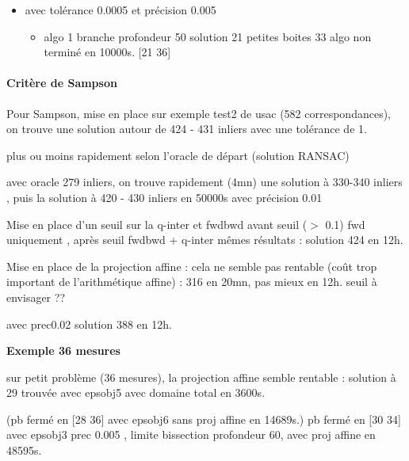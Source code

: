 \documentclass{article}
\begin{document}
\begin{itemize}
\item avec tol\'erance 0.0005  et pr\'ecision 0.005
\begin{itemize}
\item  algo 1 branche profondeur 50 solution 21   petites boites 33 algo non termin\'e en 10000s. [21 36]
\end{itemize}

\end{itemize}



\paragraph{Crit\`ere de Sampson}

Pour Sampson, mise en place 
sur exemple test2 de usac (582 correspondances),  on trouve une solution autour de 424 - 431  inliers  avec une tol\'erance de 1.

plus ou moins rapidement selon l'oracle de d\'epart  (solution RANSAC)

avec oracle 279 inliers, on trouve rapidement (4mn) une solution \`a 330-340 inliers , puis la solution \`a 420 - 430 inliers en 50000s
avec pr\'ecision 0.01

Mise en place d'un seuil sur la q-inter et fwdbwd
avant seuil ($>$ 0.1)  fwd uniquement , apr\`es seuil  fwdbwd + q-inter
m\^emes r\'esultats : solution 424 en 12h.


Mise en place de la projection affine : cela ne semble pas rentable (co\^ut trop important  de l'arithm\'etique affine)  : 316 en 20mn,
pas mieux en 12h. seuil \`a envisager ??








avec prec0.02  solution 388 en 12h.



{\bf Exemple 36 mesures}

sur petit problème (36 mesures), la projection affine semble rentable :  solution à 29 trouv\'ee avec epsobj5 avec domaine total en 3600s.

(pb ferm\'e en [28 36] avec epsobj6  sans proj affine en 14689s.)
pb ferm\'e en [30 34] avec epsobj3  prec 0.005 , limite bissection profondeur 60, avec proj affine en 48595s.
\end{document}
